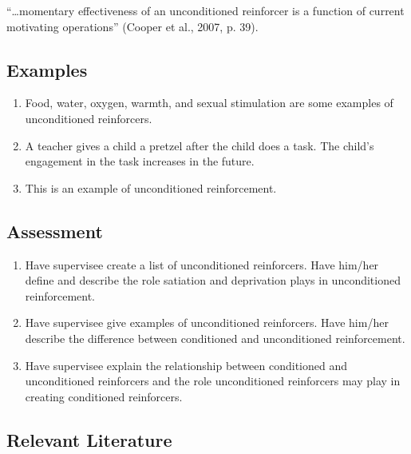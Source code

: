 ``…momentary effectiveness of an unconditioned reinforcer is a function of current motivating operations'' (Cooper et al., 2007, p. 39).
%
\subsection{Examples}
\begin{enumerate}
\item Food, water, oxygen, warmth, and sexual stimulation are some examples of unconditioned reinforcers.
\item A teacher gives a child a pretzel after the child does a task. The child's engagement in the task increases in the future. 
\item This is an example of unconditioned reinforcement.
%
\end{enumerate}
%
\subsection{Assessment}
\begin{enumerate}
\item Have supervisee create a list of unconditioned reinforcers. Have him/her define and describe the role satiation and deprivation plays in unconditioned reinforcement. 
\item Have supervisee give examples of unconditioned reinforcers. Have him/her describe the difference between conditioned and unconditioned reinforcement.
\item Have supervisee explain the relationship between conditioned and unconditioned reinforcers and the role unconditioned reinforcers may play in creating conditioned reinforcers.
\end{enumerate}
%
\subsection{Relevant Literature}
\begin{refsection}
\nocite{test,alang2017police,clayton2018black}
\printbibliography[heading=none]
\end{refsection}
%
